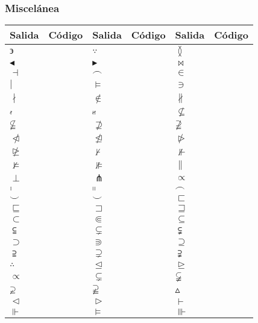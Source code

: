 \documentclass{article}
\numberwithin{equation}{section}
\theoremstyle{plain}
\theoremstyle{definition}
\theoremstyle{remark}
\def\X#1{$#1$ & \texttt{#1}} %
\begin{document}
\subsubsection{Miscelánea}

\begin{table}[H]
\centering
\begin{tabular}{@{}*6l@{}}
\toprule
Salida & Código & Salida & Código & Salida & Código \\
\midrule
\X{\backepsilon} & 
\X{\because} & 
\X{\between} \\
\X{\blacktriangleleft} & 
\X{\blacktriangleright} & 
\X{\bowtie} \\
\X{\dashv} & 
\X{\frown} & 
\X{\in} \\
\X{\mid} & 
\X{\models} & 
\X{\ni} \\ 
\X{\nmid} & 
\X{\notin} & 
\X{\nparallel} \\ 
\X{\nshortmid} & 
\X{\nshortparallel} & 
\X{\nsubseteq} \\ 
\X{\nsubseteqq} & 
\X{\nsupseteq} & 
\X{\nsupseteqq} \\ 
\X{\ntriangleleft} & 
\X{\ntrianglelefteq} & 
\X{\ntriangleright} \\ 
\X{\ntrianglerighteq} & 
\X{\nvdash} & 
\X{\nVdash} \\ 
\X{\nvDash} & 
\X{\nVDash} & 
\X{\parallel} \\
\X{\perp} & 
\X{\pitchfork} & 
\X{\propto} \\ 
\X{\shortmid} & 
\X{\shortparallel} & 
\X{\smallfrown} \\ 
\X{\smallsmile} & 
\X{\smile} & 
\X{\sqsubset} \\ 
\X{\sqsubseteq} & 
\X{\sqsupset} & 
\X{\sqsupseteq} \\ 
\X{\subset} & 
\X{\Subset} & 
\X{\subseteq} \\ 
\X{\subseteqq} & 
\X{\subsetneq} & 
\X{\subsetneqq} \\ 
\X{\supset} & 
\X{\Supset} & 
\X{\supseteq} \\ 
\X{\supseteqq} & 
\X{\supsetneq} & 
\X{\supsetneqq} \\ 
\X{\therefore} & 
\X{\trianglelefteq} & 
\X{\trianglerighteq} \\ 
\X{\varpropto} & 
\X{\varsubsetneq} & 
\X{\varsubsetneqq} \\ 
\X{\varsupsetneq} & 
\X{\varsupsetneqq} & 
\X{\vartriangle} \\ 
\X{\vartriangleleft} & 
\X{\vartriangleright} & 
\X{\vdash} \\
\X{\Vdash} & 
\X{\vDash} & 
\X{\Vvdash} \\
\bottomrule
\end{tabular}
\end{table}
\end{document}
